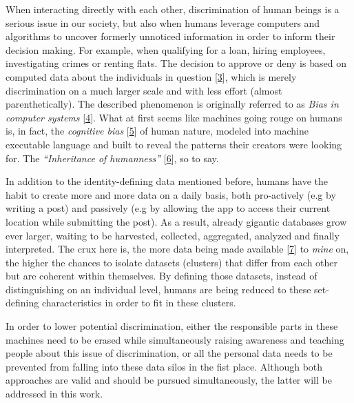 \documentclass[12pt,english,a4paper,titlepage,cleardoublepage=empty,dottedtoc]{report}
\begin{document}
When interacting directly with each other, discrimination of human
beings is a serious issue in our society, but also when humans leverage
computers and algorithms to uncover formerly unnoticed information in
order to inform their decision making. For example, when qualifying for
a loan, hiring employees, investigating crimes or renting flats. The
decision to approve or deny is based on computed data about the
individuals in question
{[}\protect\hyperlink{ref-book_2015_ethical-it-innovation_ethical-uses-of-information-and-knowledge}{3}{]},
which is merely discrimination on a much larger scale and with less
effort (almost parenthetically). The described phenomenon is originally
referred to as \emph{Bias in computer systems}
{[}\protect\hyperlink{ref-paper_1996_bias-in-computer-systems}{4}{]}.
What at first seems like machines going rouge on humans is, in fact, the
\emph{cognitive bias}
{[}\protect\hyperlink{ref-wikipedia_2016_cognitive-bias}{5}{]} of human
nature, modeled into machine executable language and built to reveal the
patterns their creators were looking for. The \emph{``Inheritance of
humanness''}
{[}\protect\hyperlink{ref-web_2016_big-data-is-people}{6}{]}, so to say.

In addition to the identity-defining data mentioned before, humans have
the habit to create more and more data on a daily basis, both
pro-actively (e.g by writing a post) and passively (e.g by allowing the
app to access their current location while submitting the post). As a
result, already gigantic databases grow ever larger, waiting to be
harvested, collected, aggregated, analyzed and finally interpreted. The
crux here is, the more data being made available
{[}\protect\hyperlink{ref-video_2015_big-data-and-deep-learning_discrimination}{7}{]}
to \emph{mine} on, the higher the chances to isolate datasets (clusters)
that differ from each other but are coherent within themselves. By
defining those datasets, instead of distinguishing on an individual
level, humans are being reduced to these set-defining characteristics in
order to fit in these clusters.

In order to lower potential discrimination, either the responsible parts
in these machines need to be erased while simultaneously raising
awareness and teaching people about this issue of discrimination, or all
the personal data needs to be prevented from falling into these data
silos in the fist place. Although both approaches are valid and should
be pursued simultaneously, the latter will be addressed in this work.
\end{document}
